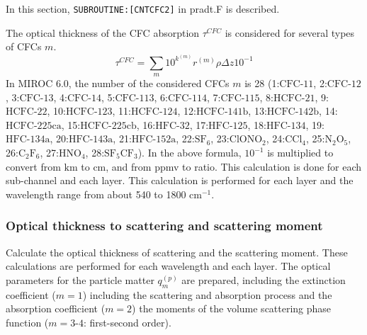 In this section, \texttt{SUBROUTINE:{[}CNTCFC2{]}} in pradt.F is
described.

The optical thickness of the CFC absorption \(\tau^{CFC}\) is considered
for several types of CFCs \(m\). \begin{equation}
\tau^{C F C}=\sum_{m} 10^{k^{(m)}} r^{(m)} \rho \Delta z 10^{-1}
\end{equation} In MIROC 6.0, the number of the considered CFCs \(m\) is 28
(1:\(\mathrm{CFC\text{-11}}\), 2:\(\mathrm{CFC\text{-12}}\),
3:\(\mathrm{CFC\text{-13}}\), 4:\(\mathrm{CFC\text{-14}}\),
5:\(\mathrm{CFC\text{-113}}\), 6:\(\mathrm{CFC\text{-114}}\),
7:\(\mathrm{CFC\text{-115}}\), 8:\(\mathrm{HCFC\text{-21}}\),
9:\(\mathrm{HCFC\text{-22}}\), 10:\(\mathrm{HCFC\text{-123}}\),
11:\(\mathrm{HCFC\text{-124}}\), 12:\(\mathrm{HCFC\text{-141b}}\),
13:\(\mathrm{HCFC\text{-142b}}\), 14:\(\mathrm{HCFC\text{-225ca}}\),
15:\(\mathrm{HCFC\text{-225cb}}\), 16:\(\mathrm{HFC\text{-32}}\),
17:\(\mathrm{HFC\text{-125}}\), 18:\(\mathrm{HFC\text{-134}}\),
19:\(\mathrm{HFC\text{-134a}}\), 20:\(\mathrm{HFC\text{-143a}}\),
21:\(\mathrm{HFC\text{-152a}}\), 22:\(\mathrm{S}\mathrm{F}_{6}\),
23:\(\mathrm{ClON}\mathrm{O}_{2}\), 24:\(\mathrm{C}\mathrm{Cl}_{4}\),
25:\(\mathrm{N}_{2}\mathrm{O}_{5}\),
26:\(\mathrm{C}_{2}\mathrm{F}_{6}\), 27:\(\mathrm{HN}\mathrm{O}_{4}\),
28:\(\mathrm{SF}_{5}\mathrm{CF}_{3}\)). In the above formula,
\(10^{-1}\) is multiplied to convert from \(\mathrm{km}\) to
\(\mathrm{cm}\), and from ppmv to ratio. This calculation is done for
each sub-channel and each layer. This calculation is performed for each
layer and the wavelength range from about 540 to 1800
\(\mathrm{cm}^{-1}\).

\hypertarget{optical-thickness-to-scattering-and-scattering-moment}{%
\subsubsection{Optical thickness to scattering and scattering
moment}\label{optical-thickness-to-scattering-and-scattering-moment}}

Calculate the optical thickness of scattering and the scattering moment.
These calculations are performed for each wavelength and each layer. The
optical parameters for the particle matter \(q_{m}^{(p)}\) are prepared,
including the extinction coefficient (\(m = 1\)) including the
scattering and absorption process and the absorption coefficient
(\(m = 2\)) the moments of the volume scattering phase function
(\(m=3\text{-}4\): first-second order).

